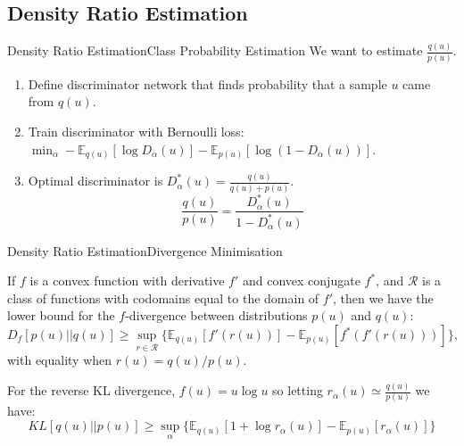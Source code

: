 \documentclass[handout]{beamer}
\begin{document}
\subsection{Density Ratio Estimation}

\begin{frame}{Density Ratio Estimation}{Class Probability Estimation}
We want to estimate $\frac{q(u)}{p(u)}$.
\vspace{0.3cm}
  \begin{enumerate}
  \item {
    Define discriminator network that finds probability that a sample $u$ came from $q(u)$.
  }
  \vspace{0.5cm}
  \item {
    Train discriminator with Bernoulli loss: $\min_\alpha -\mathbb{E}_{q(u)}[\log D_\alpha(u)]-\mathbb{E}_{p(u)}[\log(1-D_\alpha(u))]$.
  }
  \vspace{0.5cm}
  \item Optimal discriminator is $D^*_\alpha(u)=\frac{q(u)}{q(u)+p(u)}$.
  \[\frac{q(u)}{p(u)}=\frac{D^*_\alpha(u)}{1-D^*_\alpha(u)}\]
  \end{enumerate}
\end{frame}
\begin{frame}{Density Ratio Estimation}{Divergence Minimisation}
\begin{theorem}
If $f$ is a convex function with derivative $f'$ and convex conjugate $f^*$, and $\mathcal{R}$ is a class of functions with codomains equal to the domain of $f'$, then we have the lower bound for the $f$-divergence between distributions $p(u)$ and $q(u)$:
\[D_f [p(u)||q(u)]\geq \sup_{r\in \mathcal{R}} \{\mathbb{E}_{q(u)}[f'(r(u))]-\mathbb{E}_{p(u)}[f^*(f'(r(u)))]\},\]
with equality when $r(u)=q(u)/p(u)$.
\end{theorem}
For the reverse KL divergence, $f(u)=u\log u$ so letting $r_\alpha(u)\simeq \frac{q(u)}{p(u)}$ we have:
\[KL[q(u)||p(u)]\geq \sup_{\alpha}\{\mathbb{E}_{q(u)}[1+\log r_\alpha(u)]-\mathbb{E}_{p(u)}[r_\alpha(u)]\}\]

\end{frame}
\end{document}
